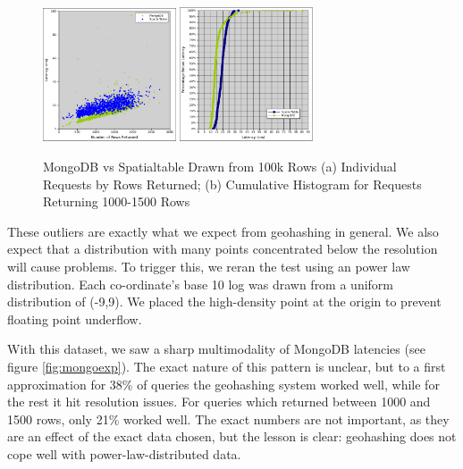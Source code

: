 \documentclass[11pt]{article}
\begin{document}
\begin{figure}[b!]
\includegraphics[width=1.55in]{st_mongo}
\includegraphics[width=1.55in]{st_mongo_cumu}
\caption{MongoDB vs Spatialtable Drawn from 100k Rows (a) Individual Requests by Rows Returned; (b) Cumulative Histogram for Requests Returning 1000-1500 Rows }
\label{fig:mongo}
\end{figure}

These outliers are exactly what we expect from geohashing in general.  We also expect that a distribution with many points concentrated below the resolution will cause problems.  To trigger this, we reran the test using an power law distribution.  Each co-ordinate's base 10 log was drawn from a uniform distribution of (-9,9).  We placed the high-density point at the origin to prevent floating point underflow.

With this dataset, we saw a sharp multimodality of MongoDB latencies (see figure \ref{fig:mongoexp}).  The exact nature of this pattern is unclear, but to a first approximation for 38\% of queries the geohashing system worked well, while for the rest it hit resolution issues.  For queries which returned between 1000 and 1500 rows, only 21\% worked well.  The exact numbers are not important, as they are an effect of the exact data chosen, but the lesson is clear: geohashing does not cope well with power-law-distributed data.
\end{document}
